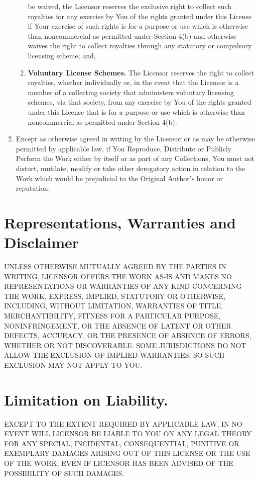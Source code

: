 \begin{enumerate}
\begin{enumerate}
              be waived, the Licensor reserves the exclusive right to
              collect such royalties for any exercise by You of the
              rights granted under this License if Your exercise of such
              rights is for a purpose or use which is otherwise than
              noncommercial as permitted under Section 4(b) and
              otherwise waives the right to collect royalties through
              any statutory or compulsory licensing scheme; and,
        \item \textbf{Voluntary License Schemes.} The Licensor reserves
              the right to collect royalties, whether individually or,
              in the event that the Licensor is a member of a collecting
              society that administers voluntary licensing schemes, via
              that society, from any exercise by You of the rights
              granted under this License that is for a purpose or use
              which is otherwise than noncommercial as permitted under
              Section 4(b).
       \end{enumerate}
 \item Except as otherwise agreed in writing by the Licensor or as may
       be otherwise permitted by applicable law, if You Reproduce,
       Distribute or Publicly Perform the Work either by itself or as
       part of any Collections, You must not distort, mutilate, modify
       or take other derogatory action in relation to the Work which
       would be prejudicial to the Original Author’s honor or
       reputation.
\end{enumerate}


\section{Representations, Warranties and Disclaimer}
UNLESS OTHERWISE MUTUALLY AGREED BY THE PARTIES IN WRITING, LICENSOR
OFFERS THE WORK AS-IS AND MAKES NO REPRESENTATIONS OR WARRANTIES OF ANY
KIND CONCERNING THE WORK, EXPRESS, IMPLIED, STATUTORY OR OTHERWISE,
INCLUDING, WITHOUT LIMITATION, WARRANTIES OF TITLE, MERCHANTIBILITY,
FITNESS FOR A PARTICULAR PURPOSE, NONINFRINGEMENT, OR THE ABSENCE OF
LATENT OR OTHER DEFECTS, ACCURACY, OR THE PRESENCE OF ABSENCE OF ERRORS,
WHETHER OR NOT DISCOVERABLE. SOME JURISDICTIONS DO NOT ALLOW THE
EXCLUSION OF IMPLIED WARRANTIES, SO SUCH EXCLUSION MAY NOT APPLY TO YOU.


\section{Limitation on Liability.}
EXCEPT TO THE EXTENT REQUIRED BY APPLICABLE LAW, IN NO EVENT WILL
LICENSOR BE LIABLE TO YOU ON ANY LEGAL THEORY FOR ANY SPECIAL,
INCIDENTAL, CONSEQUENTIAL, PUNITIVE OR EXEMPLARY DAMAGES ARISING OUT OF
THIS LICENSE OR THE USE OF THE WORK, EVEN IF LICENSOR HAS BEEN ADVISED
OF THE POSSIBILITY OF SUCH DAMAGES.


